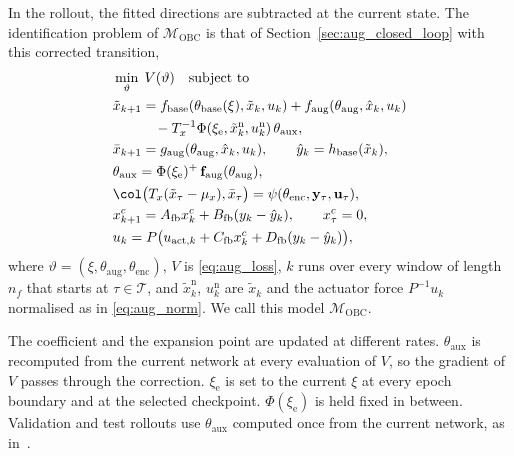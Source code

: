 In the rollout, the fitted directions are subtracted at the current state.
The identification problem of $\mathcal M_{\mathrm{OBC}}$ is that of
Section~\ref{sec:aug_closed_loop} with this corrected transition,
\begin{equation}
\begin{aligned}
 &\min_{\vartheta}\;V(\vartheta)\quad\text{subject to}\\
 &\tilde x_{k+1}=f_{\mathrm{base}}(\theta_{\mathrm{base}}(\xi),\tilde x_k,u_k)
   +f_{\mathrm{aug}}(\theta_{\mathrm{aug}},\hat x_k,u_k)\\
 &\qquad\quad-T_x^{-1}\Phi(\xi_{\mathrm e},\tilde x^{\mathrm n}_k,u^{\mathrm n}_k)\,\theta_{\mathrm{aux}},\\
 &\bar x_{k+1}=g_{\mathrm{aug}}(\theta_{\mathrm{aug}},\hat x_k,u_k),\qquad
   \hat y_k=h_{\mathrm{base}}(\tilde x_k),\\
 &\theta_{\mathrm{aux}}=\Phi(\xi_{\mathrm e})^{+}\,\mathbf f_{\mathrm{aug}}(\theta_{\mathrm{aug}}),\\
 &\col\bigl(T_x(\tilde x_{\tau}-\mu_x),\bar x_{\tau}\bigr)
   =\psi(\theta_{\mathrm{enc}},\mathbf y_\tau,\mathbf u_\tau),\\
 &x^{c}_{k+1}=A_{\mathrm{fb}}x^{c}_k+B_{\mathrm{fb}}(y_k-\hat y_k),\qquad x^{c}_\tau=0,\\
 &u_k=P\bigl(u_{\mathrm{act},k}+C_{\mathrm{fb}}x^{c}_k+D_{\mathrm{fb}}(y_k-\hat y_k)\bigr),
\end{aligned}
\label{eq:obc_model}
\end{equation}
where $\vartheta=(\xi,\theta_{\mathrm{aug}},\theta_{\mathrm{enc}})$, $V$ is
\eqref{eq:aug_loss}, $k$ runs over every window of length $n_f$ that starts
at $\tau\in\mathcal T$, and $\tilde x^{\mathrm n}_k$, $u^{\mathrm n}_k$ are
$\tilde x_k$ and the actuator force $P^{-1}u_k$ normalised as in
\eqref{eq:aug_norm}.
We call this model $\mathcal M_{\mathrm{OBC}}$.

The coefficient and the expansion point are updated at different rates.
$\theta_{\mathrm{aux}}$ is recomputed from the current network at every
evaluation of $V$, so the gradient of $V$ passes through the correction.
$\xi_{\mathrm e}$ is set to the current $\xi$ at every epoch boundary and at
the selected checkpoint.
$\Phi(\xi_{\mathrm e})$ is held fixed in between.
Validation and test rollouts use $\theta_{\mathrm{aux}}$ computed once from the
current network, as in~\cite[Eq.~(13)]{gyorok2026obc}.

